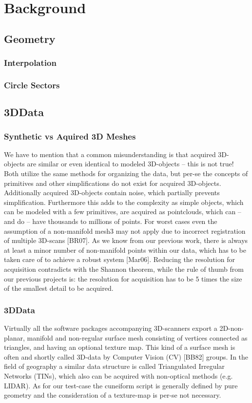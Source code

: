 \chapter{Background}
\section{Geometry}
%
\subsection{Interpolation}
%
\subsection{Circle Sectors}
%
\section{3DData}
\subsection{Synthetic vs Aquired 3D Meshes}
We have to mention that a common misunderstanding is that acquired 3D-objects
are similar or even identical to modeled 3D-objects – this is not true! 
Both utilize the same methods for organizing the data, but per-se the concepts 
of primitives and other simplifications do not exist for acquired 3D-objects. 
Additionally acquired 3D-objects contain noise, which partially prevents 
simplification. Furthermore this adds to the complexity as simple objects, 
which can be modeled with a few primitives, are acquired as pointclouds, which 
can – and do – have thousands to millions of points. For worst cases even the 
assumption of a non-manifold mesh3 may not apply due to incorrect registration 
of multiple 3D-scans [BR07]. As we know from our previous work, there is always 
at least a minor number of non-manifold points within our data, which has to be 
taken care of to achieve a robust system [Mar06]. Reducing the resolution for 
acquisition contradicts with the Shannon theorem, while the rule of thumb from 
our previous projects is: the resolution for acquisition has to be 5 times the 
size of the smallest detail to be acquired.~\cite[p.~25]{Mara12}
%
\subsection{3DData}
Virtually all the software packages accompanying 3D-scanners export
a 2D-non-planar, manifold and non-regular surface mesh consisting of vertices 
connected as triangles, and having an optional texture map. This kind of a
surface mesh is often and shortly called 3D-data by Computer Vision (CV) [BB82]
groups. In the field of geography a similar data structure is called
Triangulated Irregular Networks (TINs), which also can be acquired with
non-optical methods (e.g. LIDAR). As for our test-case the cuneiform script is
generally defined by pure geometry and the consideration of a texture-map is
per-se not necessary.~\cite[p.~25]{Mara12}
%
